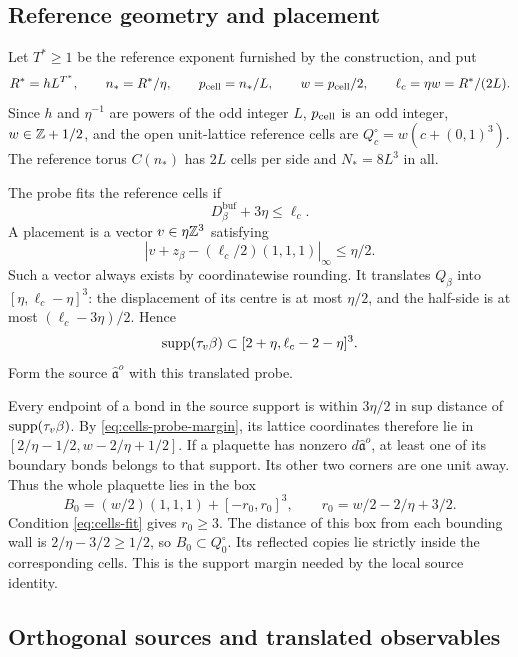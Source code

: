 \subsection{Reference geometry and placement}

Let $T^*\ge1$ be the reference exponent furnished by the
construction, and put
\[
 R^*=hL^{T^*},\qquad n_*=R^*/\eta,\qquad
 p_{\rm cell}=n_*/L,\qquad w=p_{\rm cell}/2,\qquad \ell_c=\eta w=R^*/(2L).
\]
Since $h$ and $\eta^{-1}$ are powers of the odd integer $L$,
$p_{\rm cell}$ is an odd integer, $w\in\mathbb Z+1/2$, and the open unit-lattice
reference cells are $Q_c^\circ=w(c+(0,1)^3)$.
The reference torus $C(n_*)$ has $2L$ cells per side and
$N_*=8L^3$ in all.

The probe fits the reference cells if
\begin{equation}\label{eq:cells-fit}
 D_\beta^{\mathrm{buf}}+3\eta\le\ell_c.
\end{equation}
A placement is a vector $v\in\eta\mathbb Z^3$ satisfying
\[
 |v+z_\beta-(\ell_c/2)(1,1,1)|_\infty\le\eta/2.
\]
Such a vector always exists by coordinatewise rounding.
It translates $Q_\beta$ into $[\eta,\ell_c-\eta]^3$:
the displacement of its centre is at most $\eta/2$, and
the half-side is at most $(\ell_c-3\eta)/2$.
Hence
\begin{equation}\label{eq:cells-probe-margin}
 \operatorname{supp}(\tau_v\beta)
                     \subset[2+\eta,\ell_c-2-\eta]^3.
\end{equation}
Form the source $\hat{\mathfrak a}^o$ with this translated
probe.

Every endpoint of a bond in the source support is within
$3\eta/2$ in sup distance of $\operatorname{supp}(\tau_v\beta)$.
By \eqref{eq:cells-probe-margin}, its lattice coordinates
therefore lie in
$[2/\eta-1/2,w-2/\eta+1/2]$.
If a plaquette has nonzero $d\hat{\mathfrak a}^o$, at least
one of its boundary bonds belongs to that support. Its
other two corners are one unit away. Thus the whole
plaquette lies in the box
\begin{equation}\label{eq:cells-support-box}
 B_0=(w/2)(1,1,1)+[-r_0,r_0]^3,\qquad
 r_0=w/2-2/\eta+3/2.
\end{equation}
Condition \eqref{eq:cells-fit} gives $r_0\ge3$.
The distance of this box from each bounding wall is
$2/\eta-3/2\ge1/2$, so $B_0\subset Q_0^\circ$.
Its reflected copies lie strictly inside the corresponding
cells. This is the support margin needed by the local
source identity.

\subsection{Orthogonal sources and translated observables}

